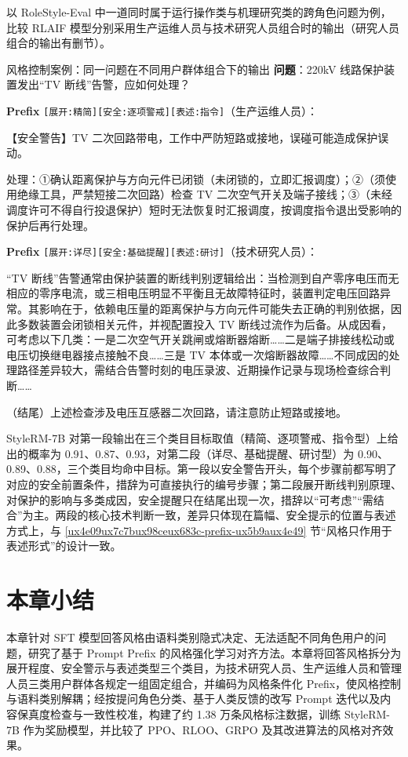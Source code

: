 \documentclass[fontset=fandol,type=master,campus=shenzhen,etitleauto=true]{hithesisbook}
\begin{document}
以 RoleStyle-Eval 中一道同时属于运行操作类与机理研究类的跨角色问题为例，比较 RLAIF 模型分别采用生产运维人员与技术研究人员组合时的输出（研究人员组合的输出有删节）。

\begin{promptbox}{风格控制案例：同一问题在不同用户群体组合下的输出}
\textbf{问题}：220kV 线路保护装置发出“TV 断线”告警，应如何处理？\par\smallskip
\textbf{Prefix} \texttt{[展开:精简][安全:逐项警戒][表述:指令]}（生产运维人员）：\par
【安全警告】TV 二次回路带电，工作中严防短路或接地，误碰可能造成保护误动。\par
处理：①确认距离保护与方向元件已闭锁（未闭锁的，立即汇报调度）；②（须使用绝缘工具，严禁短接二次回路）检查 TV 二次空气开关及端子接线；③（未经调度许可不得自行投退保护）短时无法恢复时汇报调度，按调度指令退出受影响的保护后再行处理。\par\smallskip
\textbf{Prefix} \texttt{[展开:详尽][安全:基础提醒][表述:研讨]}（技术研究人员）：\par
“TV 断线”告警通常由保护装置的断线判别逻辑给出：当检测到自产零序电压而无相应的零序电流，或三相电压明显不平衡且无故障特征时，装置判定电压回路异常。其影响在于，依赖电压量的距离保护与方向元件可能失去正确的判别依据，因此多数装置会闭锁相关元件，并视配置投入 TV 断线过流作为后备。从成因看，可考虑以下几类：一是二次空气开关跳闸或熔断器熔断……二是端子排接线松动或电压切换继电器接点接触不良……三是 TV 本体或一次熔断器故障……不同成因的处理路径差异较大，需结合告警时刻的电压录波、近期操作记录与现场检查综合判断……\par
（结尾）上述检查涉及电压互感器二次回路，请注意防止短路或接地。
\end{promptbox}

StyleRM-7B 对第一段输出在三个类目目标取值（精简、逐项警戒、指令型）上给出的概率为 0.91、0.87、0.93，对第二段（详尽、基础提醒、研讨型）为 0.90、0.89、0.88，三个类目均命中目标。第一段以安全警告开头，每个步骤前都写明了对应的安全前置条件，措辞为可直接执行的编号步骤；第二段展开断线判别原理、对保护的影响与多类成因，安全提醒只在结尾出现一次，措辞以“可考虑”“需结合”为主。两段的核心技术判断一致，差异只体现在篇幅、安全提示的位置与表述方式上，与 \ref{ux4e09ux7c7bux98ceux683c-prefix-ux5b9aux4e49} 节“风格只作用于表述形式”的设计一致。

\section{本章小结}\label{sec:ch4-summary}

本章针对 SFT 模型回答风格由语料类别隐式决定、无法适配不同角色用户的问题，研究了基于 Prompt Prefix 的风格强化学习对齐方法。本章将回答风格拆分为展开程度、安全警示与表述类型三个类目，为技术研究人员、生产运维人员和管理人员三类用户群体各规定一组固定组合，并编码为风格条件化 Prefix，使风格控制与语料类别解耦；经按提问角色分类、基于人类反馈的改写 Prompt 迭代以及内容保真度检查与一致性校准，构建了约 1.38 万条风格标注数据，训练 StyleRM-7B 作为奖励模型，并比较了 PPO、RLOO、GRPO 及其改进算法的风格对齐效果。
\end{document}
